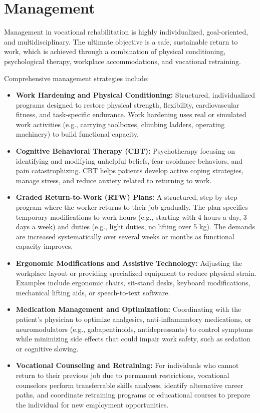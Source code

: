 \section*{Management}
Management in vocational rehabilitation is highly individualized, goal-oriented, and multidisciplinary. The ultimate objective is a safe, sustainable return to work, which is achieved through a combination of physical conditioning, psychological therapy, workplace accommodations, and vocational retraining.

Comprehensive management strategies include:
\begin{itemize}
    \item \textbf{Work Hardening and Physical Conditioning:} Structured, individualized programs designed to restore physical strength, flexibility, cardiovascular fitness, and task-specific endurance. Work hardening uses real or simulated work activities (e.g., carrying toolboxes, climbing ladders, operating machinery) to build functional capacity.
    \item \textbf{Cognitive Behavioral Therapy (CBT):} Psychotherapy focusing on identifying and modifying unhelpful beliefs, fear-avoidance behaviors, and pain catastrophizing. CBT helps patients develop active coping strategies, manage stress, and reduce anxiety related to returning to work.
    \item \textbf{Graded Return-to-Work (RTW) Plans:} A structured, step-by-step program where the worker returns to their job gradually. The plan specifies temporary modifications to work hours (e.g., starting with 4 hours a day, 3 days a week) and duties (e.g., light duties, no lifting over 5 kg). The demands are increased systematically over several weeks or months as functional capacity improves.
    \item \textbf{Ergonomic Modifications and Assistive Technology:} Adjusting the workplace layout or providing specialized equipment to reduce physical strain. Examples include ergonomic chairs, sit-stand desks, keyboard modifications, mechanical lifting aids, or speech-to-text software.
    \item \textbf{Medication Management and Optimization:} Coordinating with the patient's physician to optimize analgesics, anti-inflammatory medications, or neuromodulators (e.g., gabapentinoids, antidepressants) to control symptoms while minimizing side effects that could impair work safety, such as sedation or cognitive slowing.
    \item \textbf{Vocational Counseling and Retraining:} For individuals who cannot return to their previous job due to permanent restrictions, vocational counselors perform transferrable skills analyses, identify alternative career paths, and coordinate retraining programs or educational courses to prepare the individual for new employment opportunities.
\end{itemize}

